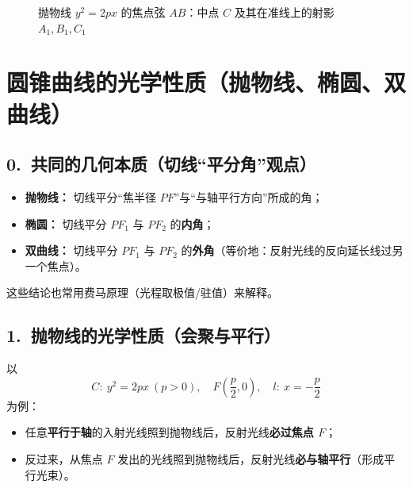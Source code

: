 \documentclass[UTF8]{ctexart}
\begin{document}
\begin{figure}[htbp]
{
	}
		\caption{抛物线 $y^{2}=2px$ 的焦点弦 $AB$：中点 $C$ 及其在准线上的射影 $A_1,B_1,C_1$}
	\end{figure}
	
	\section*{圆锥曲线的光学性质（抛物线、椭圆、双曲线）}
	
	\subsection*{0.\ 共同的几何本质（切线“平分角”观点）}
	
	
	
	
	
	\begin{itemize}
		\item \textbf{抛物线：} 切线平分“焦半径 $PF$”与“与轴平行方向”所成的角；
		\item \textbf{椭圆：} 切线平分 $PF_1$ 与 $PF_2$ 的\textbf{内角}；
		\item \textbf{双曲线：} 切线平分 $PF_1$ 与 $PF_2$ 的\textbf{外角}（等价地：反射光线的反向延长线过另一个焦点）。
	\end{itemize}
	这些结论也常用费马原理（光程取极值/驻值）来解释。
	
	\subsection*{1.\ 抛物线的光学性质（会聚与平行）}
	以
	\[
	C:\ y^2=2px\ (p>0),\quad F\left(\frac p2,0\right),\quad l:\ x=-\frac p2
	\]
	为例：
	\begin{itemize}
		\item 任意\textbf{平行于轴}的入射光线照到抛物线后，反射光线\textbf{必过焦点 $F$}；
		\item 反过来，从焦点 $F$ 发出的光线照到抛物线后，反射光线\textbf{必与轴平行}（形成平行光束）。
	\end{itemize}
	
\end{document}
